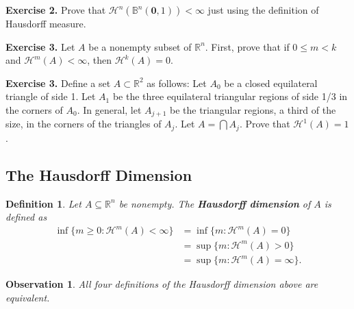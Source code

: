 \documentclass[10pt]{article}
\theoremstyle{plain}
\newtheorem{definition}{Definition}
\newtheorem{observation}{Observation}
\begin{document}
	\noindent \textbf{Exercise 2.} Prove that $\mathcal{H}^n(\mathbb{B}^n(\mathbf{0}, 1)) < \infty$ just using the definition of Hausdorff measure.
	
	\noindent \textbf{Exercise 3.} Let $A$ be a nonempty subset of $\mathbb{R}^n$. First, prove that if $0 \leq m < k$ and $\mathcal{H}^m(A) < \infty$, then $\mathcal{H}^k(A) = 0$. 
	
	\noindent \textbf{Exercise 3.} Define a set $A \subset \mathbb{R}^2$ as follows: Let $A_0$ be a closed equilateral triangle of side 1. Let $A_1$ be the three equilateral triangular regions of side 1/3 in the corners of $A_0$. In general, let $A_{j + 1}$ be the triangular regions, a third of the size, in the corners of the triangles of $A_j$. Let $A = \bigcap A_j$. Prove that $\mathcal{H}^1(A) = 1$. 

\newpage 
\subsection*{The Hausdorff Dimension}
\newpage 


	\begin{definition}
		Let $A \subseteq \mathbb{R}^n$ be nonempty. The \textbf{\textit{Hausdorff dimension}} of $A$ is defined as 
			\begin{align*}
				\inf\{m \geq 0 : \mathcal{H}^m(A) < \infty\} &= \inf \{m : \mathcal{H}^m(A) = 0\} \\ 
				&= \sup \{m : \mathcal{H}^m(A) > 0\} \\
				&= \sup \{m : \mathcal{H}^m(A) = \infty\}.
			\end{align*}
	\end{definition}


	\begin{observation}
		All four definitions of the Hausdorff dimension above are equivalent.
	\end{observation}
\end{document}
